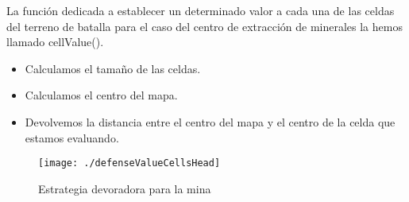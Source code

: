 La función dedicada a establecer un determinado valor a cada una de las celdas del terreno de batalla para el caso del centro de extracción de minerales la hemos llamado cellValue().
\begin{itemize}
\item Calculamos el tamaño de las celdas.
\item Calculamos el centro del mapa.
\item Devolvemos la distancia entre el centro del mapa y el centro de la celda que estamos evaluando.
\end{itemize}
\begin{figure}
\centering
\texttt{[image: ./defenseValueCellsHead]}
\caption{Estrategia devoradora para la mina}
\label{fig:defenseValueCellsHead}
\end{figure}